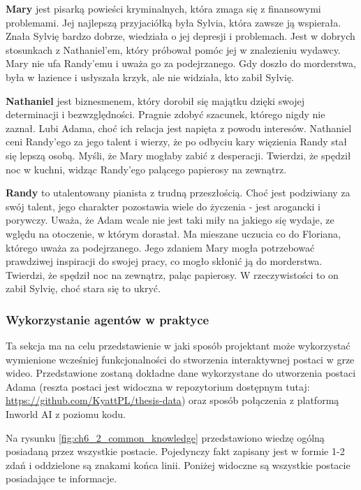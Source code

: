 \textbf{Mary} jest pisarką powieści kryminalnych, która zmaga się z finansowymi problemami. Jej najlepszą
przyjaciółką była Sylvia, która zawsze ją wspierała. Znała Sylvię bardzo dobrze, wiedziała o jej
depresji i problemach. Jest w dobrych stosunkach z Nathaniel'em, który próbował pomóc jej w
znalezieniu wydawcy. Mary nie ufa Randy'emu i uważa go za podejrzanego. Gdy doszło do morderstwa,
była w łazience i usłyszała krzyk, ale nie widziała, kto zabił Sylvię.

\textbf{Nathaniel} jest biznesmenem, który dorobił się majątku dzięki swojej determinacji i bezwzględności.
Pragnie zdobyć szacunek, którego nigdy nie zaznał. Lubi Adama, choć ich relacja jest
napięta z powodu interesów. Nathaniel ceni Randy'ego za jego talent i wierzy, że po odbyciu kary
więzienia Randy stał się lepszą osobą. Myśli, że Mary mogłaby zabić z desperacji. Twierdzi, że
spędził noc w kuchni, widząc Randy'ego palącego papierosy na zewnątrz.

\textbf{Randy} to utalentowany pianista z trudną przeszłością. Choć jest podziwiany za swój talent, jego
charakter pozostawia wiele do życzenia - jest arogancki i porywczy. Uważa, że Adam wcale nie jest taki
miły na jakiego się wydaje, ze wględu na otoczenie, w którym dorastał. Ma mieszane uczucia co do Floriana,
którego uważa za podejrzanego. Jego zdaniem Mary mogła potrzebować prawdziwej inspiracji do swojej pracy, co
mogło skłonić ją do morderstwa. Twierdzi, że spędził noc na zewnątrz, paląc papierosy. W rzeczywistości
to on zabił Sylvię, choć stara się to ukryć.

\subsubsection*{Wykorzystanie agentów w praktyce}

Ta sekcja ma na celu przedstawienie w jaki sposób projektant może wykorzystać wymienione wcześniej
funkcjonalności do stworzenia interaktywnej postaci w grze wideo. Przedstawione zostaną dokładne dane
wykorzystane do utworzenia postaci Adama (reszta postaci jest widoczna w repozytorium dostępnym tutaj:
\href{https://github.com/KyattPL/thesis-data}{https://github.com/KyattPL/thesis-data}) oraz
sposób połączenia z platformą Inworld AI z poziomu kodu.

\newpage

Na rysunku \ref{fig:ch6_2_common_knowledge} przedstawiono wiedzę ogólną posiadaną przez wszystkie postacie.
Pojedynczy fakt zapisany jest w formie 1-2 zdań i oddzielone są znakami końca linii. Poniżej widoczne
są wszystkie postacie posiadające te informacje.

